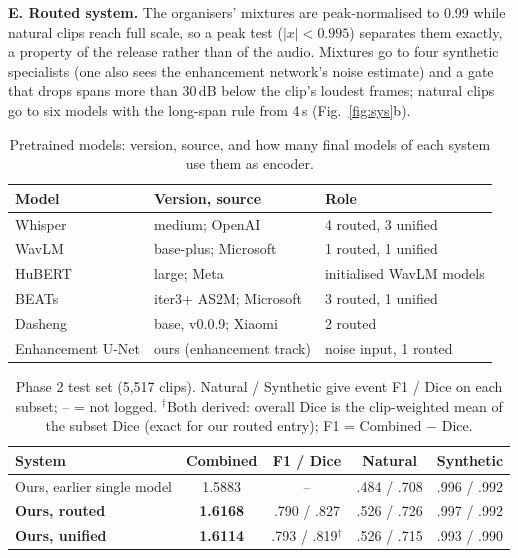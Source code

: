 \documentclass[conference]{IEEEtran}
\begin{document}
\textbf{E. Routed system.}
The organisers' mixtures are peak-normalised to 0.99 while natural clips reach full scale, so a peak test ($|x|<0.995$) separates them exactly, a property of the release rather than of the audio.
Mixtures go to four synthetic specialists (one also sees the enhancement network's noise estimate) and a gate that drops spans more than 30\,dB below the clip's loudest frames; natural clips go to six models with the long-span rule from 4\,s (Fig.~\ref{fig:sys}b).

\begin{table}[t]
\caption{Pretrained models: version, source, and how many final models of each system use them as encoder.}
\label{tab:pre}
\centering\footnotesize
\begin{tabular}{@{}lll@{}}
\toprule
Model & Version, source & Role \\
\midrule
Whisper~\cite{whisper} & medium; OpenAI & 4 routed, 3 unified \\
WavLM~\cite{wavlm} & base-plus; Microsoft & 1 routed, 1 unified \\
HuBERT~\cite{hubert} & large; Meta & initialised WavLM models \\
BEATs~\cite{beats} & iter3+ AS2M; Microsoft & 3 routed, 1 unified \\
Dasheng~\cite{dasheng} & base, v0.0.9; Xiaomi & 2 routed \\
Enhancement U-Net & ours (enhancement track) & noise input, 1 routed \\
\bottomrule
\end{tabular}
\end{table}

\begin{table}[t]
\caption{Phase 2 test set (5,517 clips). Natural / Synthetic give event F1 / Dice on each subset; -- = not logged. $^\dagger$Both derived: overall Dice is the clip-weighted mean of the subset Dice (exact for our routed entry); F1 = Combined $-$ Dice.}
\label{tab:main}
\centering\footnotesize\setlength{\tabcolsep}{2.6pt}
\begin{tabular}{@{}lcccc@{}}
\toprule
System & Combined & F1 / Dice & Natural & Synthetic \\
\midrule
Ours, earlier single model & 1.5883 & -- & .484 / .708 & .996 / .992 \\
\textbf{Ours, routed} & \textbf{1.6168} & .790 / .827 & .526 / .726 & .997 / .992 \\
\textbf{Ours, unified} & \textbf{1.6114} & .793 / .819$^\dagger$ & .526 / .715 & .993 / .990 \\
\bottomrule
\end{tabular}
\end{table}
\end{document}
